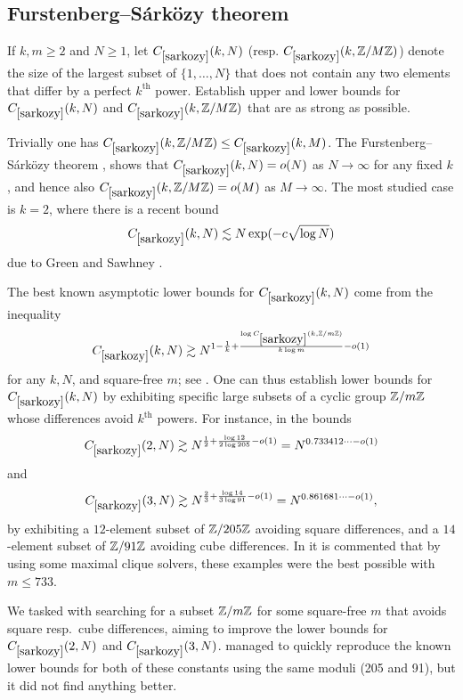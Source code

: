 \subsection{Furstenberg--S\'ark\"ozy theorem}

\renewcommand{\problemURL}{https://google-deepmind.github.io/alphaevolve_repository_of_problems/problems/31.html}

\begin{problem}\label{sarkozy}  If $k, m \geq 2$ and $N \geq 1$, let $C_{\ref{sarkozy}}(k,N)$ (resp. $C_{\ref{sarkozy}}(k,\mathbb{Z}/M\mathbb{Z})$) denote the size of the largest subset of $\{1,\dots,N\}$
that does not contain any two elements that differ by a perfect $k^{\mathrm{th}}$ power.  Establish upper and lower bounds for $C_{\ref{sarkozy}}(k,N)$ and $C_{\ref{sarkozy}}(k,\mathbb{Z}/M\mathbb{Z})$ that are as strong as possible.
\end{problem}


Trivially one has $C_{\ref{sarkozy}}(k,\mathbb{Z}/M\mathbb{Z}) \leq C_{\ref{sarkozy}}(k,M)$.  The Furstenberg--S\'ark\"ozy theorem \cite{furstenberg}, \cite{sarkozy} shows that $C_{\ref{sarkozy}}(k,N) = o(N)$ as $N \to \infty$ for any fixed $k$, and hence also $C_{\ref{sarkozy}}(k,\mathbb{Z}/M\mathbb{Z}) = o(M)$ as $M \to \infty$.  The most studied case is $k=2$, where there is a recent bound 
$$ C_{\ref{sarkozy}}(k,N) \lesssim N \exp(-c\sqrt{\log N})$$
due to Green and Sawhney \cite{green-sawhney}.

The best known asymptotic lower bounds for $C_{\ref{sarkozy}}(k,N)$ come from the inequality
$$C_{\ref{sarkozy}}(k,N) \gtrsim N^{1 - \frac{1}{k} + \frac{\log C_{\ref{sarkozy}}(k,\mathbb{Z}/m\mathbb{Z})}{k \log m}-o(1)}$$
for any $k,N$, and square-free $m$;  see \cite{lewko,ruzsa-squares}.  One can thus establish lower bounds for $C_{\ref{sarkozy}}(k,N)$ by exhibiting specific large subsets of a cyclic group $\mathbb{Z}/m\mathbb{Z}$ whose differences avoid $k^{\mathrm{th}}$ powers.  For instance, in \cite{lewko} the bounds
$$ C_{\ref{sarkozy}}(2,N) \gtrsim  N^{\frac{1}{2} + \frac{\log 12}{2\log 205}-o(1)} = N^{0.733412\dots-o(1)}$$
and
$$ C_{\ref{sarkozy}}(3,N) \gtrsim N^{\frac{2}{3} + \frac{ \log 14}{3 \log 91}-o(1)} = N^{0.861681\dots-o(1)},$$
by exhibiting a $12$-element subset of $\mathbb{Z}/205\mathbb{Z}$ avoiding square differences, and a $14$-element subset of $\mathbb{Z}/91\mathbb{Z}$ avoiding cube differences.  In \cite{lewko} it is commented that by using some maximal clique solvers, these examples were the best possible with $m \leq 733$. 

We tasked \AlphaEvolve with searching for a subset $\mathbb{Z}/m\mathbb{Z}$ for some square-free $m$ that avoids square resp.~cube differences, aiming to improve the lower bounds for $C_{\ref{sarkozy}}(2,N)$ and  $C_{\ref{sarkozy}}(3,N)$. \AlphaEvolve managed to quickly reproduce the known lower bounds for both of these constants using the same moduli (205 and 91), but it did not find anything better.


